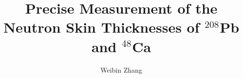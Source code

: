 \documentclass[phd,bottom,nosig,dvipsnames]{usbthesis}
\author{Weibin Zhang}%
\title{Precise Measurement of the Neutron Skin Thicknesses of $^{208}$Pb and $^{48}$Ca}%
\begin{document}
\singlespacing %
\maketitle %
\makeapproval %

\begin{abstract}

\end{abstract}
\tableofcontents %
\listoffigures %
%
%
\begin{acknowledgements}
    
\end{acknowledgements}
\pagestyle{thesis}
\newpage
{}
\setlength{\baselineskip}{15.pt}
% 








\renewcommand{\baselinestretch}{1}
\normalsize

\clearpage
\newpage
{}%
%


\clearpage
\newpage

\appendix

%
\end{document}
